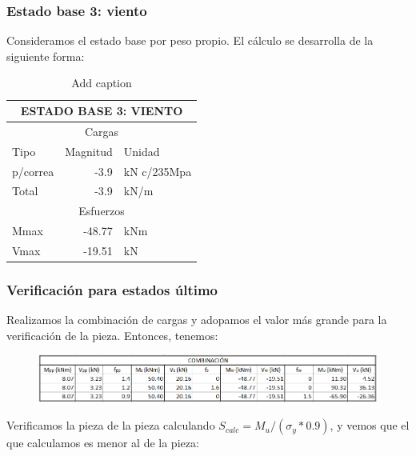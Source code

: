 \documentclass[../main.tex]{subfiles}
\begin{document}
\subsubsection{Estado base 3: viento}

Consideramos el estado base por peso propio. El cálculo se desarrolla de la
siguiente forma:

\begin{table}[ht]
  \centering
  \caption{Add caption}
    \begin{tabular}{|l|r|l|}
    \hline
    \multicolumn{3}{|c|}{\textbf{ESTADO BASE 3: VIENTO}} \bigstrut\\
    \hline
    \multicolumn{3}{|c|}{Cargas} \bigstrut\\
    \hline
    Tipo  & \multicolumn{1}{l|}{Magnitud} & Unidad \bigstrut\\
    \hline
    p/correa & -3.9  & kN c/235Mpa \bigstrut\\
    \hline
    Total & -3.9  & kN/m \bigstrut\\
    \hline
    \multicolumn{3}{|c|}{Esfuerzos} \bigstrut\\
    \hline
    Mmax  & -48.77 & kNm \bigstrut\\
    \hline
    Vmax  & -19.51 & kN \bigstrut\\
    \hline
    \end{tabular}%
\end{table}%

\subsubsection{Verificación para estados último}

Realizamos la combinación de cargas y adopamos el valor más grande para la 
verificación de la pieza. Entonces, tenemos:

\begin{figure}[ht]
  \centering
  \includegraphics[width=1.1\textwidth]{../images/combinacion_viga}
  \label{fig:combinacion_viga}
\end{figure}

Verificamos la pieza de la pieza calculando $S_{calc}= M_u / (\sigma_y * 0.9)$,
y vemos que el que calculamos es menor al de la pieza:
\end{document}
